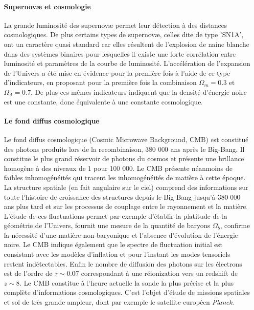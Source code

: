 \paragraph{Supernovæ et cosmologie}
La grande luminosité des supernovæ permet leur détection à des distances cosmologiques. De plus certains types de supernovæ, celles dite de type 'SN1A', ont un caractère quasi standard car elles résultent de l'explosion de naine blanche dans des systèmes binaires pour lesquelles il existe une forte corrélation entre luminosité et paramètres de la courbe de luminosité. L'accélération  de l'expansion de l'Univers a été mise en évidence pour la première fois à l'aide de ce type d'indicateurs, en proposant pour la première fois la combinaison $\Omega_m=0.3$ et $\Omega_\Lambda=0.7$. De plus ces mêmes indicateurs indiquent que la densité d'énergie noire est une constante, donc équivalente à une constante cosmologique.

\paragraph{Le fond diffus cosmologique}
Le fond diffus cosmologique (Cosmic Microwave Background, CMB) est constitué des photons produits lors de la recombinaison, 380 000 ans après le Big-Bang. Il constitue le plus grand réservoir de photons du cosmos et présente une brillance homogène à des niveaux de 1 pour 100 000. Le CMB présente néanmoins de faibles inhomogénéités qui tracent les inhomogénéités de matière à cette époque. La structure spatiale (en fait angulaire sur le ciel) comprend des informations sur toute l'histoire de croissance des structures depuis le Big-Bang jusqu'à 380 000 ans plus tard et sur les processus de couplage entre le rayonnement et la matière. L'étude de ces fluctuations permet par exemple d'établir la platitude de la géométrie de l'Univers, fournit une mesure de la quantité de baryons $\Omega_b$, confirme la nécessité d'une matière non-baryonique et l'absence d'évolution de l'énergie noire. Le CMB indique également que le spectre de fluctuation initial est consistant avec les modèles d'inflation  et pour l'instant les modes tensoriels restent indétectables. Enfin le nombre de diffusion  des photons sur les électrons est de l'ordre de $\tau\sim 0.07$ correspondant à une réionization vers un redshift de $z\sim8$. Le CMB constitue à l'heure actuelle la sonde la plus précise et la plus complète d'informations cosmologiques. C'est l'objet d'étude de missions spatiales et sol de très grande ampleur, dont par exemple le satellite européen \textit{Planck}.


